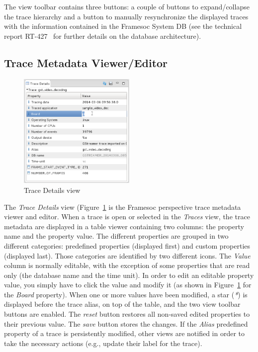 \documentclass[twoside]{article}
\begin{document}
\begin{sloppypar}
The view toolbar contains three buttons: a couple of buttons to expand/collapse the trace hierarchy and a button to manually resynchronize the displayed traces with the information contained in the Framesoc System DB (see the technical report RT-427~\cite{pagano:hal} for further details on the database architecture).

\subsection{Trace Metadata Viewer/Editor}
\label{subsec:metadata}

\begin{figure}[H]
  \centering
    \includegraphics[width=0.5\textwidth]{images/metadata_editing.png}
  \caption{Trace Details view}
  \label{fig:metadata_editing}
\end{figure}

The \emph{Trace Details} view (Figure~\ref{fig:metadata_editing} is the Framesoc perspective trace metadata viewer and editor.
When a trace is open or selected in the \emph{Traces} view, the trace metadata are displayed in a table viewer containing two columns: the property name and the property value. 
The different properties are grouped in two different categories: predefined properties (displayed first) and custom properties (displayed last). 
Those categories are identified by two different icons.
The \emph{Value} column is normally editable, with the exception of some properties that are read only (the database name and the time unit).
In order to edit an editable property value, you simply have to click the value and modify it (as shown in Figure~\ref{fig:metadata_editing} for the \emph{Board} property).
When one or more values have been modified, a star (\emph{*}) is displayed before the trace alias, on top of the table, and the two view toolbar buttons are enabled. 
The \emph{reset} button restores all non-saved edited properties to their previous value.
The \emph{save} button stores the changes.
If the \emph{Alias} predefined property of a trace is persistently modified, other views are notified in order to take the necessary actions (e.g., update their label for the trace).


\end{sloppypar}
\end{document}
